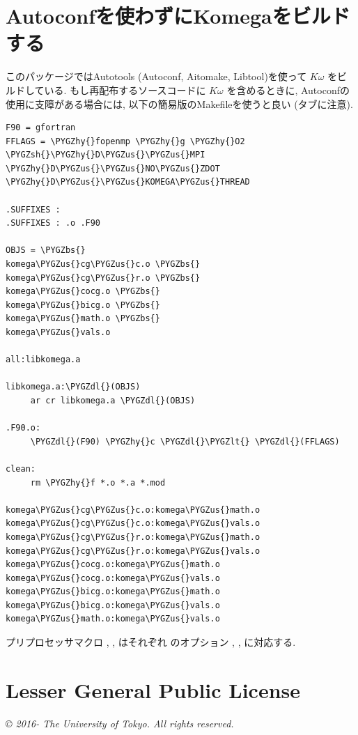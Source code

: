 \documentclass[letterpaper,10pt,dvipdfmx,openany]{sphinxmanual}
\def\PYGZbs{\char`\\}
\def\PYGZus{\char`\_}
\def\PYGZlt{\char`\<}
\def\PYGZsh{\char`\#}
\def\PYGZdl{\char`\$}
\def\PYGZhy{\char`\-}
\begin{document}
\section{Autoconfを使わずにKomegaをビルドする}
\label{komega_copyright_ja:autoconfkomega}
このパッケージではAutotools (Autoconf, Aitomake, Libtool)を使って \(K\omega\) をビルドしている.
もし再配布するソースコードに \(K\omega\) を含めるときに,
Autoconfの使用に支障がある場合には, 以下の簡易版のMakefileを使うと良い (タブに注意).

\begin{Verbatim}[commandchars=\\\{\}]
F90 = gfortran
FFLAGS = \PYGZhy{}fopenmp \PYGZhy{}g \PYGZhy{}O2 \PYGZsh{}\PYGZhy{}D\PYGZus{}\PYGZus{}MPI \PYGZhy{}D\PYGZus{}\PYGZus{}NO\PYGZus{}ZDOT \PYGZhy{}D\PYGZus{}\PYGZus{}KOMEGA\PYGZus{}THREAD

.SUFFIXES :
.SUFFIXES : .o .F90

OBJS = \PYGZbs{}
komega\PYGZus{}cg\PYGZus{}c.o \PYGZbs{}
komega\PYGZus{}cg\PYGZus{}r.o \PYGZbs{}
komega\PYGZus{}cocg.o \PYGZbs{}
komega\PYGZus{}bicg.o \PYGZbs{}
komega\PYGZus{}math.o \PYGZbs{}
komega\PYGZus{}vals.o

all:libkomega.a

libkomega.a:\PYGZdl{}(OBJS)
     ar cr libkomega.a \PYGZdl{}(OBJS)

.F90.o:
     \PYGZdl{}(F90) \PYGZhy{}c \PYGZdl{}\PYGZlt{} \PYGZdl{}(FFLAGS)

clean:
     rm \PYGZhy{}f *.o *.a *.mod

komega\PYGZus{}cg\PYGZus{}c.o:komega\PYGZus{}math.o
komega\PYGZus{}cg\PYGZus{}c.o:komega\PYGZus{}vals.o
komega\PYGZus{}cg\PYGZus{}r.o:komega\PYGZus{}math.o
komega\PYGZus{}cg\PYGZus{}r.o:komega\PYGZus{}vals.o
komega\PYGZus{}cocg.o:komega\PYGZus{}math.o
komega\PYGZus{}cocg.o:komega\PYGZus{}vals.o
komega\PYGZus{}bicg.o:komega\PYGZus{}math.o
komega\PYGZus{}bicg.o:komega\PYGZus{}vals.o
komega\PYGZus{}math.o:komega\PYGZus{}vals.o
\end{Verbatim}

プリプロセッサマクロ , ,  はそれぞれ
 のオプション , , 
に対応する.


\section{Lesser General Public License}
\label{komega_copyright_ja:lesser-general-public-license}\label{komega_copyright_ja:lgplicense}
\emph{© 2016- The University of Tokyo. All rights reserved.}
\end{document}
